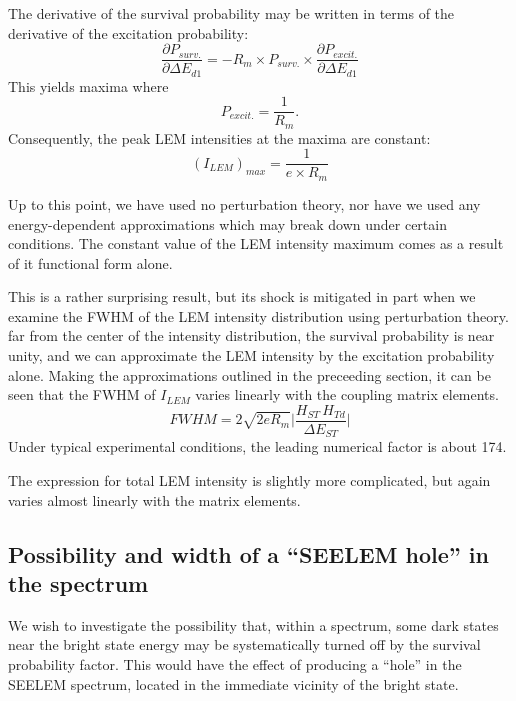 \documentclass{article}
\begin{document}
The derivative of the survival probability may be written in terms of
the derivative of the excitation probability:
\begin{equation}
  \frac{\partial P_{surv.}}{\partial \Delta E_{d1}} = 
  - R_m \times P_{surv.} \times 
  \frac{\partial P_{excit.}}{\partial \Delta E_{d1}}
\end{equation}
This yields maxima where
\begin{equation}
  P_{excit.} = \frac{1}{R_m} .
\end{equation}
Consequently, the peak LEM intensities at the maxima are constant:
\begin{equation}
  (I_{LEM})_{max} = \frac{1}{e \times R_m}
\end{equation}

Up to this point, we have used no perturbation theory, nor have we
used any energy-dependent approximations which may break down under
certain conditions. The constant value of the LEM intensity maximum
comes as a result of it functional form alone.

This is a rather surprising result, but its shock is mitigated in part
when we examine the FWHM of the LEM intensity distribution using
perturbation theory. far from the center of the intensity
distribution, the survival probability is near unity, and we can
approximate the LEM intensity by the excitation probability
alone. Making the approximations outlined in the preceeding section,
it can be seen that the FWHM of $I_{LEM}$ varies linearly with the
coupling matrix elements.
\begin{equation}
FWHM = 2 \sqrt{2 e R_m} \biggl\lvert
\frac{H_{ST} \, H_{Td}}{\Delta E_{ST}} \biggr\rvert
\end{equation}
Under typical experimental conditions, the leading numerical factor is
about 174.

The expression for total LEM intensity is slightly more complicated,
but again varies almost linearly with the matrix elements.

\subsection{Possibility and width of a ``SEELEM hole'' in the
  spectrum}

We wish to investigate the possibility that, within a spectrum, some
dark states near the bright state energy may be systematically turned
off by the survival probability factor. This would have the effect of
producing a ``hole'' in the SEELEM spectrum, located in the immediate
vicinity of the bright state.
\end{document}
